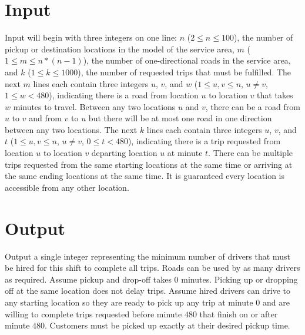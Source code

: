 \section*{Input}
Input will begin with three integers on one line: $n$ ($2 \leq n \leq 100$), the number of pickup or destination locations in the model of the service area, $m$ ($1 \leq m \leq n*(n-1)$), the number of one-directional roads in the service area, and $k$ ($1 \leq k \leq 1000$), the number of requested trips that must be fulfilled. The next $m$ lines each contain three integers $u$, $v$, and $w$ ($1 \leq u,v \leq n$, $u \neq v$, $1 \leq w < 480$), indicating there is a road from location $u$ to location $v$ that takes $w$ minutes to travel. Between any two locations $u$ and $v$, there can be a road from $u$ to $v$ and from $v$ to $u$ but there will be at most one road in one direction between any two locations. The next $k$ lines each contain three integers $u$, $v$, and $t$ ($1 \leq u,v \leq n$, $u \neq v$, $0 \leq t < 480$), indicating there is a trip requested from location $u$ to location $v$ departing location $u$ at minute $t$. There can be multiple trips requested from the same starting locations at the same time or arriving at the same ending locations at the same time. It is guaranteed every location is accessible from any other location.

\section*{Output}
Output a single integer representing the minimum number of drivers that must be hired for this shift to complete all trips. Roads can be used by as many drivers as required. Assume pickup and drop-off takes $0$ minutes. Picking up or dropping off at the same location does not delay trips. Assume hired drivers can drive to any starting location so they are ready to pick up any trip at minute $0$ and are willing to complete trips requested before minute $480$ that finish on or after minute $480$. Customers must be picked up exactly at their desired pickup time.
